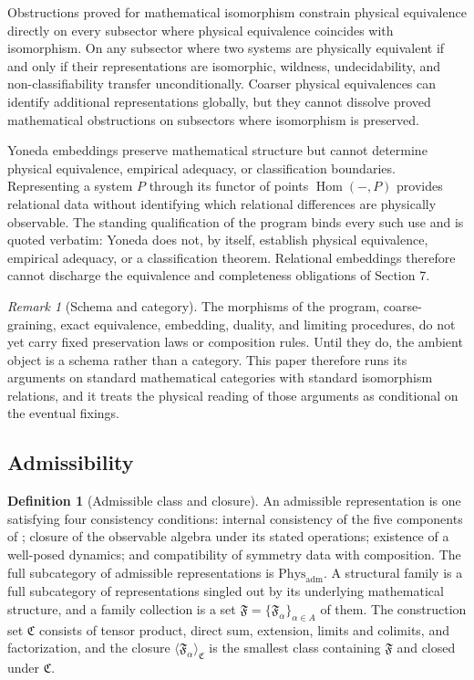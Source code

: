 \documentclass[11pt,letterpaper]{article}
\theoremstyle{definition}
\newtheorem{definition}[theorem]{Definition}
\theoremstyle{remark}
\newtheorem{remark}[theorem]{Remark}
\begin{document}
Obstructions proved for mathematical isomorphism constrain physical equivalence directly on every subsector where physical equivalence coincides with isomorphism. On any subsector where two systems are physically equivalent if and only if their representations are isomorphic, wildness, undecidability, and non-classifiability transfer unconditionally. Coarser physical equivalences can identify additional representations globally, but they cannot dissolve proved mathematical obstructions on subsectors where isomorphism is preserved.

Yoneda embeddings preserve mathematical structure but cannot determine physical equivalence, empirical adequacy, or classification boundaries. Representing a system $P$ through its functor of points $\operatorname{Hom}(-, P)$ provides relational data without identifying which relational differences are physically observable. The standing qualification of the program binds every such use and is quoted verbatim: Yoneda does not, by itself, establish physical equivalence, empirical adequacy, or a classification theorem. Relational embeddings therefore cannot discharge the equivalence and completeness obligations of Section 7.

\begin{remark}[Schema and category]
The morphisms of the program, coarse-graining, exact equivalence, embedding, duality, and limiting procedures, do not yet carry fixed preservation laws or composition rules. Until they do, the ambient object is a schema rather than a category. This paper therefore runs its arguments on standard mathematical categories with standard isomorphism relations, and it treats the physical reading of those arguments as conditional on the eventual fixings.
\end{remark}

\subsection{Admissibility}

\begin{definition}[Admissible class and closure]
\label{def:adm}
An admissible representation is one satisfying four consistency conditions: internal consistency of the five components of ; closure of the observable algebra under its stated operations; existence of a well-posed dynamics; and compatibility of symmetry data with composition. The full subcategory of admissible representations is $\mathrm{Phys}_{\mathrm{adm}}$. A structural family is a full subcategory of representations singled out by its underlying mathematical structure, and a family collection is a set $\mathfrak{F} = \{\mathfrak{F}_\alpha\}_{\alpha \in A}$ of them. The construction set $\mathfrak{C}$ consists of tensor product, direct sum, extension, limits and colimits, and factorization, and the closure $\langle \mathfrak{F}_\alpha \rangle_{\mathfrak{C}}$ is the smallest class containing $\mathfrak{F}$ and closed under $\mathfrak{C}$.
\end{definition}
\end{document}
